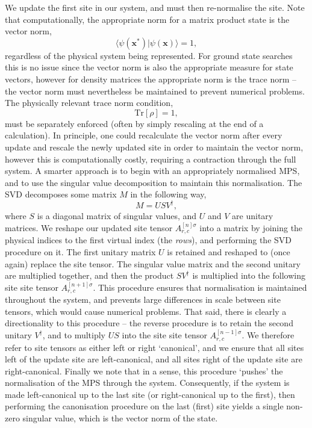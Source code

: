 We update the first site in our system, and must then re-normalise the site. Note that computationally, the appropriate norm for a matrix product state is the vector norm,
\begin{equation}
	\langle \psi(\mathbf{x}^{*}) | \psi(\mathbf{x}) \rangle = 1,
	\label{eq:vs1-12}
\end{equation}
regardless of the physical system being represented. For ground state searches this is no issue since the vector norm is also the appropriate measure for state vectors, however for density matrices the appropriate norm is the trace norm -- the vector norm must nevertheless be maintained to prevent numerical problems. The physically relevant trace norm condition,
\begin{equation}
	\mathrm{Tr}[\rho] = 1,
	\label{eq:vs1-13}
\end{equation}
must be separately enforced (often by simply rescaling at the end of a calculation). In principle, one could recalculate the vector norm after every update and rescale the newly updated site in order to maintain the vector norm, however this is computationally costly, requiring a contraction through the full system. A smarter approach is to begin with an appropriately normalised MPS, and to use the singular value decomposition to maintain this normalisation. The SVD decomposes some matrix \(M\) in the following way,
\begin{equation}
	M = U S V^{\dagger},
	\label{eq:vs1-14}
\end{equation}
where \(S\) is a diagonal matrix of singular values, and \(U\) and \(V\) are unitary matrices. We reshape our updated site tensor \(A^{[n] \sigma}_{r,c}\) into a matrix by joining the physical indices to the first virtual index (the \emph{rows}), and performing the SVD procedure on it. The first unitary matrix \(U\) is retained and reshaped to (once again) replace the site tensor. The singular value matrix and the second unitary are multiplied together, and then the product \(SV^{\dagger}\) is multiplied into the following site site tensor \(A^{[n+1] \sigma}_{r,c}\). This procedure ensures that normalisation is maintained throughout the system, and prevents large differences in scale between site tensors, which would cause numerical problems. That said, there is clearly a directionality to this procedure -- the reverse procedure is to retain the second unitary \(V^{\dagger}\), and to multiply \(US\) into the site site tensor \(A^{[n-1] \sigma}_{r,c}\). We therefore refer to site tensors as either left or right `canonical', and we ensure that all sites left of the update site are left-canonical, and all sites right of the update site are right-canonical. Finally we note that in a sense, this procedure `pushes' the normalisation of the MPS through the system. Consequently, if the system is made left-canonical up to the last site (or right-canonical up to the first), then performing the canonisation procedure on the last (first) site yields a single non-zero singular value, which is the vector norm of the state.

